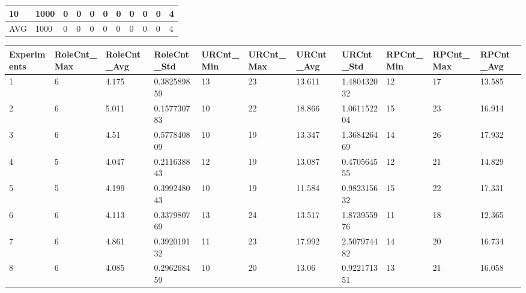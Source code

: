 \begin{table}[H]
\begin{adjustbox}{max width=380pt,keepaspectratio,angle=90}
\begin{tabular}{|l|l|l|l|l|l|l|l|l|l|l|}
					\rowcolor[HTML]{FFFFFF} 
					10          & 1000  & 0         & 0         & 0         & 0         & 0         & 0         & 0         & 0         & 4            \\ \hline
					\rowcolor[HTML]{FFFFFF} 
					AVG         & 1000  & 0         & 0         & 0         & 0         & 0         & 0         & 0         & 0         & 4            \\ \hline
				\end{tabular}
			\end{adjustbox}
			\begin{adjustbox}{max width=380pt,keepaspectratio,angle=90}
				\begin{tabular}{|l|l|l|l|l|l|l|l|l|l|l|}
					\hline
					\rowcolor[HTML]{EFEFEF} 
					Experiments & RoleCnt\_Max & RoleCnt\_Avg & RoleCnt\_Std & URCnt\_Min & URCnt\_Max & URCnt\_Avg & URCnt\_Std  & RPCnt\_Min & RPCnt\_Max & RPCnt\_Avg \\ \hline
					1           & 6            & 4.175        & 0.382589859  & 13         & 23         & 13.611     & 1.480432032 & 12         & 17         & 13.585     \\ \hline
					2           & 6            & 5.011        & 0.157730783  & 10         & 22         & 18.866     & 1.061152204 & 15         & 23         & 16.914     \\ \hline
					3           & 6            & 4.51         & 0.577840809  & 10         & 19         & 13.347     & 1.368426469 & 14         & 26         & 17.932     \\ \hline
					4           & 5            & 4.047        & 0.211638843  & 12         & 19         & 13.087     & 0.470564555 & 12         & 21         & 14.829     \\ \hline
					5           & 5            & 4.199        & 0.399248043  & 10         & 19         & 11.584     & 0.982315632 & 15         & 22         & 17.331     \\ \hline
					6           & 6            & 4.113        & 0.337980769  & 13         & 24         & 13.517     & 1.873955976 & 11         & 18         & 12.365     \\ \hline
					7           & 6            & 4.861        & 0.392019132  & 11         & 23         & 17.992     & 2.507974482 & 14         & 20         & 16.734     \\ \hline
					8           & 6            & 4.085        & 0.296268459  & 10         & 20         & 13.06      & 0.922171351 & 13         & 21         & 16.058     \\ \hline

\end{tabular}
\end{adjustbox}
\end{table}
